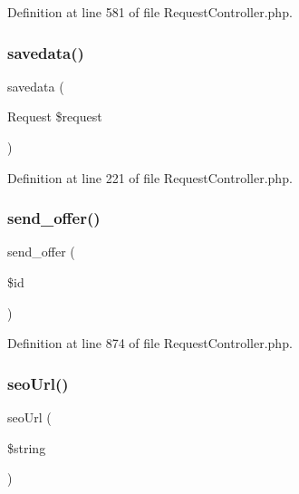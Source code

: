 Definition at line 581 of file Request\+Controller.\+php.

\mbox{\label{class_responsive_1_1_http_1_1_controllers_1_1_request_controller_a39992cc1c190dd16b2de573a70a7f5dc}} 
\subsubsection{\texorpdfstring{savedata()}{savedata()}}
{\footnotesize\ttfamily savedata (\begin{DoxyParamCaption}\item[{Request}]{\$request }\end{DoxyParamCaption})\hspace{0.3cm}{\ttfamily [protected]}}



Definition at line 221 of file Request\+Controller.\+php.

\mbox{\label{class_responsive_1_1_http_1_1_controllers_1_1_request_controller_a7c46e935fa9d506b1f29dbd92b587044}} 
\subsubsection{\texorpdfstring{send\_offer()}{send\_offer()}}
{\footnotesize\ttfamily send\+\_\+offer (\begin{DoxyParamCaption}\item[{}]{\$id }\end{DoxyParamCaption})}



Definition at line 874 of file Request\+Controller.\+php.

\mbox{\label{class_responsive_1_1_http_1_1_controllers_1_1_request_controller_a99b5491ac6f1b84c2ea18a859cf2d44b}} 
\subsubsection{\texorpdfstring{seoUrl()}{seoUrl()}}
{\footnotesize\ttfamily seo\+Url (\begin{DoxyParamCaption}\item[{}]{\$string }\end{DoxyParamCaption})}



